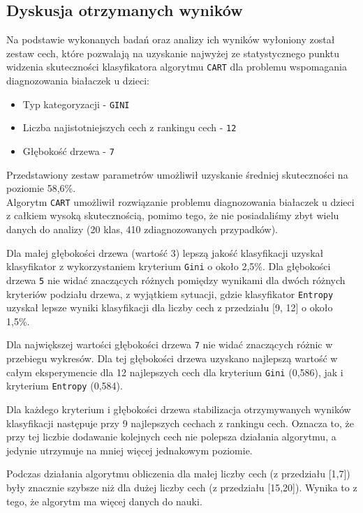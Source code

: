 \documentclass{article}
\begin{document}
\subsection{Dyskusja otrzymanych wyników}
\quad Na podstawie wykonanych badań oraz analizy ich wyników wyłoniony został zestaw cech, które pozwalają na uzyskanie najwyżej ze statystycznego punktu widzenia skuteczności klasyfikatora algorytmu \texttt{CART} dla problemu wspomagania diagnozowania białaczek u dzieci:
\begin{itemize}
    \item Typ kategoryzacji - \texttt{GINI}
    \item Liczba najistotniejszych cech z rankingu cech - \texttt{12}
    \item Głębokość drzewa - \texttt{7}
\end{itemize}

Przedstawiony zestaw parametrów umożliwił uzyskanie średniej skuteczności na poziomie 58,6\%.\\ Algorytm \texttt{CART} umożliwił rozwiązanie problemu diagnozowania białaczek u dzieci z całkiem wysoką skutecznością, pomimo tego, że nie posiadaliśmy zbyt wielu danych do analizy (20 klas, 410 zdiagnozowanych przypadków).

Dla małej głębokości drzewa (wartość 3) lepszą jakość klasyfikacji uzyskał klasyfikator z wykorzystaniem kryterium \texttt{Gini} o około 2,5\%. Dla głębokości drzewa \texttt{5} nie widać znaczących różnych pomiędzy wynikami dla dwóch różnych kryteriów podziału drzewa, z wyjątkiem sytuacji, gdzie klasyfikator \texttt{Entropy} uzyskał lepsze wyniki klasyfikacji dla liczby cech z przedziału [9, 12] o około 1,5\%. 

Dla największej wartości głębokości drzewa \texttt{7} nie widać znaczących różnic w przebiegu wykresów. Dla tej głębokości drzewa uzyskano najlepszą wartość w całym eksperymencie dla 12 najlepszych cech dla kryterium \texttt{Gini} (0,586), jak i kryterium \texttt{Entropy} (0,584).

Dla każdego kryterium i głębokości drzewa stabilizacja otrzymywanych wyników klasyfikacji następuje przy 9 najlepszych cechach z rankingu cech. Oznacza to, że przy tej liczbie dodawanie kolejnych cech nie polepsza działania algorytmu, a jedynie utrzymuje na mniej więcej jednakowym poziomie.

Podczas działania algorytmu obliczenia dla małej liczby cech (z przedziału [1,7]) były znacznie szybsze niż dla dużej liczby cech (z przedziału [15,20]). Wynika to z tego, że algorytm ma więcej danych do nauki.
\newpage
\end{document}

